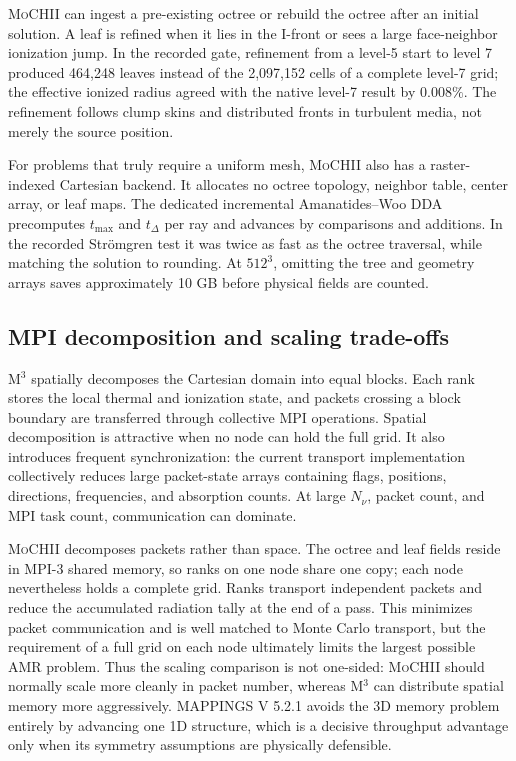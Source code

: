\documentclass[english,a4paper]{my_memo}
\newcommand{\MoCHII}{\textsc{MoCHII}}
\newcommand{\Mthree}{M$^3$}
\newcommand{\Mappings}{MAPPINGS V 5.2.1}
\begin{document}
\MoCHII{} can ingest a pre-existing octree or rebuild the octree after an
initial solution.  A leaf is refined when it lies in the I-front or sees a
large face-neighbor ionization jump.  In the recorded gate, refinement
from a level-5 start to level 7 produced 464,248 leaves instead of the
2,097,152 cells of a complete level-7 grid; the effective ionized radius
agreed with the native level-7 result by $0.008\%$.  The refinement follows
clump skins and distributed fronts in turbulent media, not merely the
source position.

For problems that truly require a uniform mesh, \MoCHII{} also has a
raster-indexed Cartesian backend.  It allocates no octree topology,
neighbor table, center array, or leaf maps.  The dedicated incremental
Amanatides--Woo DDA precomputes $t_{\max}$ and $t_\Delta$ per ray and
advances by comparisons and additions.  In the recorded Str\"omgren test
it was twice as fast as the octree traversal, while matching the solution
to rounding.  At $512^3$, omitting the tree and geometry arrays saves
approximately 10 GB before physical fields are counted.

\subsection{MPI decomposition and scaling trade-offs}

\Mthree{} spatially decomposes the Cartesian domain into equal blocks.
Each rank stores the local thermal and ionization state, and packets
crossing a block boundary are transferred through collective MPI
operations.  Spatial decomposition is attractive when no node can hold
the full grid.  It also introduces frequent synchronization: the current
transport implementation collectively reduces large packet-state arrays
containing flags, positions, directions, frequencies, and absorption
counts.  At large $N_\nu$, packet count, and MPI task count, communication
can dominate.

\MoCHII{} decomposes packets rather than space.  The octree and leaf fields
reside in MPI-3 shared memory, so ranks on one node share one copy; each
node nevertheless holds a complete grid.  Ranks transport independent
packets and reduce the accumulated radiation tally at the end of a pass.
This minimizes packet communication and is well matched to Monte Carlo
transport, but the requirement of a full grid on each node ultimately
limits the largest possible AMR problem.  Thus the scaling comparison is not
one-sided: \MoCHII{} should normally scale more cleanly in packet number,
whereas \Mthree{} can distribute spatial memory more aggressively.
\Mappings{} avoids the 3D memory problem entirely by advancing one 1D
structure, which is a decisive throughput advantage only when its symmetry
assumptions are physically defensible.
\end{document}
